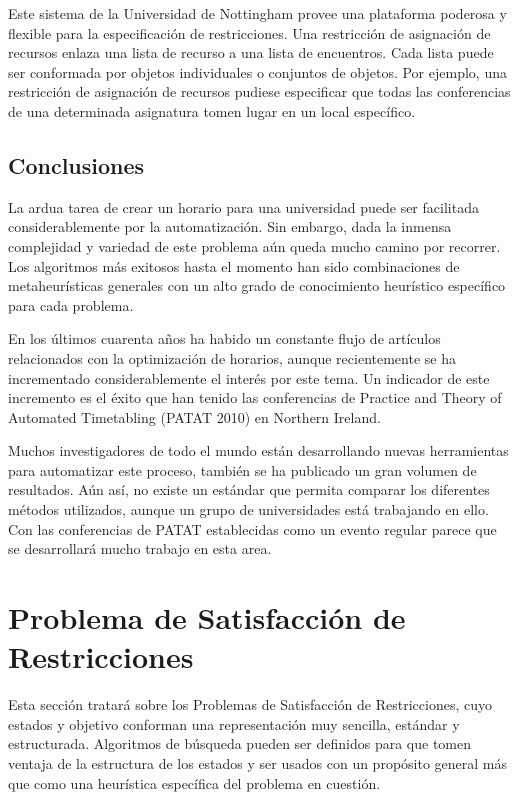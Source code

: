 Este sistema de la Universidad de Nottingham provee una plataforma poderosa y flexible para la especificación de restricciones. Una restricción de asignación de recursos enlaza una lista de recurso a una lista de encuentros. Cada lista puede ser conformada por objetos individuales o conjuntos de objetos. Por ejemplo, una restricción de asignación de recursos pudiese especificar que todas las conferencias de una determinada asignatura tomen lugar en un local específico.

\subsection{Conclusiones}

La ardua tarea de crear un horario para una universidad puede ser facilitada considerablemente por la automatización. Sin embargo, dada la inmensa complejidad y variedad de este problema aún queda mucho camino por recorrer. Los algoritmos más exitosos hasta el momento han sido combinaciones de metaheurísticas generales con un alto grado de conocimiento heurístico específico para cada problema.

En los últimos cuarenta años ha habido un constante flujo de artículos relacionados con la optimización de horarios, aunque recientemente se ha incrementado considerablemente el inter\'es por este tema. Un indicador de este incremento es el \'exito que han tenido las conferencias de Practice and Theory of Automated Timetabling (PATAT 2010) en Northern Ireland.

Muchos investigadores de todo el mundo están desarrollando nuevas herramientas para automatizar este proceso, tambi\'en se ha publicado un gran volumen de resultados. Aún así, no existe un estándar que permita comparar los diferentes m\'etodos utilizados, aunque un grupo de universidades está trabajando en ello. Con las conferencias de PATAT establecidas como un evento regular parece que se desarrollará mucho trabajo en esta area.

\section{Problema de Satisfacción de Restricciones}

Esta sección tratará sobre los Problemas de Satisfacción de Restricciones, cuyo estados y objetivo conforman una representación muy sencilla, estándar y estructurada. Algoritmos de búsqueda pueden ser definidos para que tomen ventaja de la estructura de los estados y ser usados con un propósito general más que como una heurística específica del problema en cuestión.

